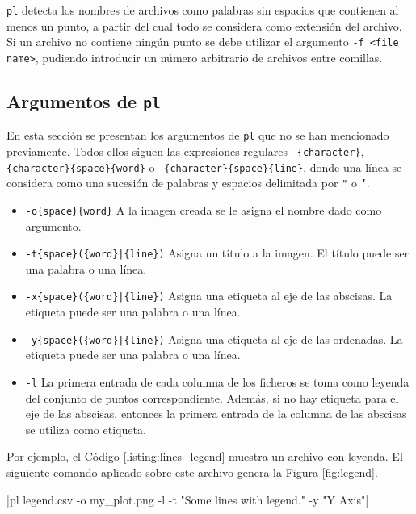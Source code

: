 \documentclass{article}
\begin{document}
		\texttt{pl} detecta los nombres de archivos como palabras sin espacios que contienen al menos un punto, a partir del cual todo se considera como extensión del archivo. Si un archivo no contiene ningún punto se debe utilizar el argumento \texttt{-f <file name>}, pudiendo introducir un número arbitrario de archivos entre comillas.

	\subsection{Argumentos de \texttt{pl}} \label{sec:pl:arguments}

		En esta sección se presentan los argumentos de \texttt{pl} que no se han mencionado previamente. Todos ellos siguen las expresiones regulares \texttt{-\{character\}}, \texttt{-\{character\}\{space\}\{word\}} o \texttt{-\{character\}\{space\}\{line\}}, donde una línea se considera como una sucesión de palabras y espacios delimitada por \texttt{"} o \texttt{'}.
	
		\begin{itemize}
			\item \texttt{-o\{space\}\{word\}} A la imagen creada se le asigna el nombre dado como argumento.

			\item \texttt{-t\{space\}(\{word\}|\{line\})} Asigna un título a la imagen. El título puede ser una palabra o una línea.
	
			\item \texttt{-x\{space\}(\{word\}|\{line\})} Asigna una etiqueta al eje de las abscisas. La etiqueta puede ser una palabra o una línea.
	
			\item \texttt{-y\{space\}(\{word\}|\{line\})} Asigna una etiqueta al eje de las ordenadas. La etiqueta puede ser una palabra o una línea.
				
			\item \texttt{-l} La primera entrada de cada columna de los ficheros se toma como leyenda del conjunto de puntos correspondiente. Además, si no hay etiqueta para el eje de las abscisas, entonces la primera entrada de la columna de las abscisas se utiliza como etiqueta.
		\end{itemize}

		Por ejemplo, el Código \ref{listing:lines_legend} muestra un archivo con leyenda. El siguiente comando aplicado sobre este archivo genera la Figura \ref{fig:legend}.
		
		|pl legend.csv -o my_plot.png -l -t "Some lines with legend." -y "Y Axis"|
	
\end{document}
